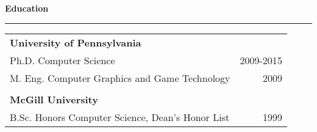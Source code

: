 \needspace{6em}
{\Large {\bf Education}} 
\vspace{0.1cm}
\hrule
\medskip

\begin{tabular*}{7.1in}{@{}l@{\extracolsep\fill}r}
{\bf University of Pennsylvania} \\
Ph.D. Computer Science & 2009-2015\\
M. Eng. Computer Graphics and Game Technology & 2009 \\
\phantom{yommomma} & \phantom{2002}\\
{\bf McGill University} \\
B.Sc. Honors Computer Science, Dean's Honor List & 1999 \\
\end{tabular*}
